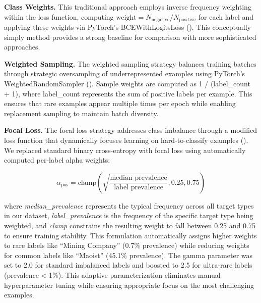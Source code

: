 \documentclass[
  11pt,
]{article}
\begin{document}
\textbf{Class Weights.} This traditional approach employs inverse
frequency weighting within the loss function, computing
\(\text{weight} = N_{\text{negative}}/N_{\text{positive}}\) for each
label and applying these weights via PyTorch's BCEWithLogitsLoss
(). This conceptually simply
method provides a strong baseline for comparison with more sophisticated
approaches.

\textbf{Weighted Sampling.} The weighted sampling strategy balances
training batches through strategic oversampling of underrepresented
examples using PyTorch's WeightedRandomSampler
(). Sample
weights are computed as 1 / (label\_count + 1), where label\_count
represents the sum of positive labels per example. This ensures that
rare examples appear multiple times per epoch while enabling replacement
sampling to maintain batch diversity.

\textbf{Focal Loss.} The focal loss strategy addresses class imbalance
through a modified loss function that dynamically focuses learning on
hard-to-classify examples (). We
replaced standard binary cross-entropy with focal loss using
automatically computed per-label alpha weights:

\[\alpha_{\text{pos}} = \text{clamp}\left(\sqrt{\frac{\text{median prevalence}}{\text{label prevalence}}}, 0.25, 0.75\right)\]

where \emph{median\_prevalence} represents the typical frequency across
all target types in our dataset, \emph{label\_prevalence} is the
frequency of the specific target type being weighted, and \emph{clamp}
constrains the resulting weight to fall between 0.25 and 0.75 to ensure
training stability. This formulation automatically assigns higher
weights to rare labels like ``Mining Company'' (0.7\% prevalence) while
reducing weights for common labels like ``Maoist'' (45.1\% prevalence).
The gamma parameter was set to 2.0 for standard imbalanced labels and
boosted to 2.5 for ultra-rare labels (prevalence \textless{} 1\%). This
adaptive parameterization eliminates manual hyperparameter tuning while
ensuring appropriate focus on the most challenging examples.
\end{document}
